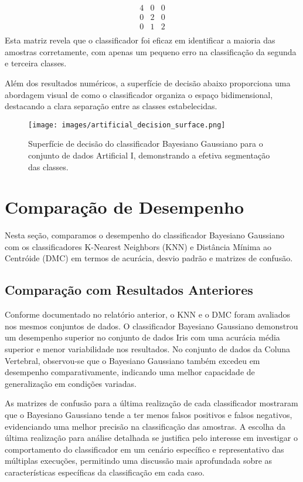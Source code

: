 \documentclass[12pt, a4paper]{report}
\begin{document}
\[
\begin{array}{ccc}
4 & 0 & 0 \\
0 & 2 & 0 \\
0 & 1 & 2 \\
\end{array}
\]
Esta matriz revela que o classificador foi eficaz em identificar a maioria das amostras corretamente, com apenas um pequeno erro na classificação da segunda e terceira classes.

Além dos resultados numéricos, a superfície de decisão abaixo proporciona uma abordagem visual de como o classificador organiza o espaço bidimensional, destacando a clara separação entre as classes estabelecidas.

\begin{figure}[H]
\centering
\texttt{[image: images/artificial\_decision\_surface.png]}
\caption{Superfície de decisão do classificador Bayesiano Gaussiano para o conjunto de dados Artificial I, demonstrando a efetiva segmentação das classes.}
\label{fig:artificial_decision_surface}
\end{figure}


\section{Comparação de Desempenho}
Nesta seção, comparamos o desempenho do classificador Bayesiano Gaussiano com os classificadores K-Nearest Neighbors (KNN) e Distância Mínima ao Centróide (DMC) em termos de acurácia, desvio padrão e matrizes de confusão.

\subsection{Comparação com Resultados Anteriores}
Conforme documentado no relatório anterior, o KNN e o DMC foram avaliados nos mesmos conjuntos de dados. O classificador Bayesiano Gaussiano demonstrou um desempenho superior no conjunto de dados Iris com uma acurácia média superior e menor variabilidade nos resultados. No conjunto de dados da Coluna Vertebral, observou-se que o Bayesiano Gaussiano também excedeu em desempenho comparativamente, indicando uma melhor capacidade de generalização em condições variadas.

As matrizes de confusão para a última realização de cada classificador mostraram que o Bayesiano Gaussiano tende a ter menos falsos positivos e falsos negativos, evidenciando uma melhor precisão na classificação das amostras. A escolha da última realização para análise detalhada se justifica pelo interesse em investigar o comportamento do classificador em um cenário específico e representativo das múltiplas execuções, permitindo uma discussão mais aprofundada sobre as características específicas da classificação em cada caso.
\end{document}
